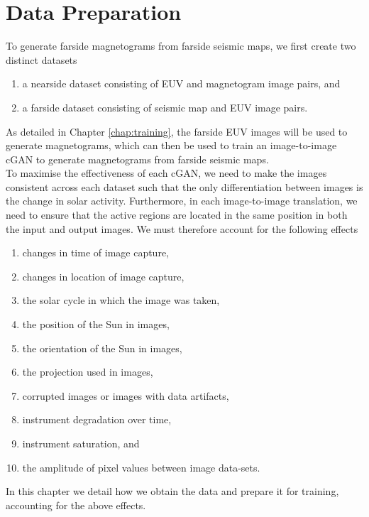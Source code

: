 \documentclass[11pt,a4paper,onecolumn]{report}
\begin{document}






%
%
%
%
\chapter{Data Preparation}
\label{chap:data}
%
%
%
%

To generate farside magnetograms from farside seismic maps, we first create two
distinct datasets
\begin{enumerate}
  \item a nearside dataset consisting of EUV and magnetogram image pairs, and
  \item a farside dataset consisting of seismic map and EUV image pairs.
\end{enumerate}
As detailed in Chapter \ref{chap:training}, the farside EUV images will be used
to generate magnetograms, which can then be used to train an image-to-image cGAN
to generate magnetograms from farside seismic maps. \\


To maximise the effectiveness of each cGAN, we need to make the images consistent
across each dataset such that the only differentiation between images is the
change in solar activity. Furthermore, in each image-to-image translation, we
need to ensure that the active regions are located in the same position in both the
input and output images. We must therefore account for the following effects
\begin{enumerate}[i]
  \item changes in time of image capture, 
  \item changes in location of image capture,
  \item the solar cycle in which the image was taken,
  \item the position of the Sun in images,
  \item the orientation of the Sun in images,
  \item the projection used in images,
  \item corrupted images or images with data artifacts,
  \item instrument degradation over time,
  \item instrument saturation, and
  \item the amplitude of pixel values between image data-sets.
\end{enumerate}
In this chapter we detail how we obtain the data and prepare it for training,
accounting for the above effects.
\end{document}
